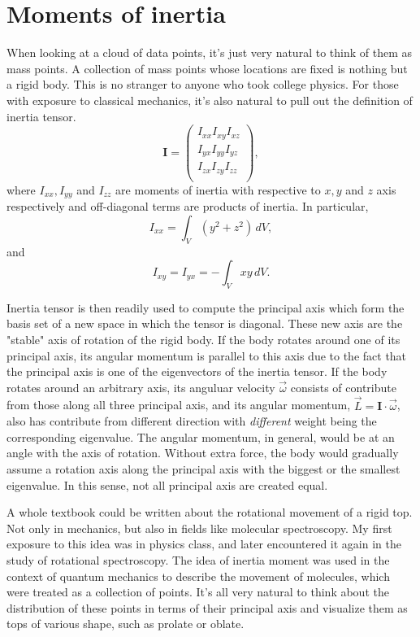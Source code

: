 \section{Moments of inertia}
When looking at a cloud of data points, it's just very natural to think of them as mass points. A collection of mass points whose locations are fixed is nothing but a rigid body. This is no stranger to anyone who took college physics. For those with exposure to classical mechanics, it's also natural to pull out the definition of inertia tensor.
\begin{equation}
	\mathbf{I} = \begin{pmatrix}
			I_{xx} I_{xy} I_{xz}\\
			I_{yx} I_{yy} I_{yz}\\
			I_{zx} I_{zy} I_{zz}\\
		     \end{pmatrix},
\end{equation}
where $I_{xx}, I_{yy}$ and $I_{zz}$ are moments of inertia with respective to $x, y$ and $z$ axis respectively and off-diagonal terms are products of inertia. In particular,
\begin{equation}
I_{xx} = \int_V(y^2+z^2)\,dV,
\end{equation}
and
\begin{equation}
I_{xy} = I_{yx} = -\int_Vxy\,dV.
\end{equation}

Inertia tensor is then readily used to compute the principal axis which form the basis set of a new space in which the tensor is diagonal. These new axis are the "stable" axis of rotation of the rigid body. If the body rotates around one of its principal axis, its angular momentum is parallel to this axis due to the fact that the principal axis is one of the eigenvectors of the inertia tensor. If the body rotates around an arbitrary axis, its anguluar velocity $\vec\omega$ consists of contribute from those along all three principal axis, and its angular momentum, $\vec L=\mathbf I\cdot\vec\omega$, also has contribute from different direction with \emph{different} weight being the corresponding eigenvalue. The angular momentum, in general, would be at an angle with the axis of rotation. Without extra force, the body would gradually assume a rotation axis along the principal axis with the biggest or the smallest eigenvalue. In this sense, not all principal axis are created equal. 

A whole textbook could be written about the rotational movement of a rigid top. Not only in mechanics, but also in fields like molecular spectroscopy. My first exposure to this idea was in physics class, and later encountered it again in the study of rotational spectroscopy. The idea of inertia moment was used in the context of quantum mechanics to describe the movement of molecules, which were treated as a collection of points. It's all very natural to think about the distribution of these points in terms of their principal axis and visualize them as tops of various shape, such as prolate or oblate.


